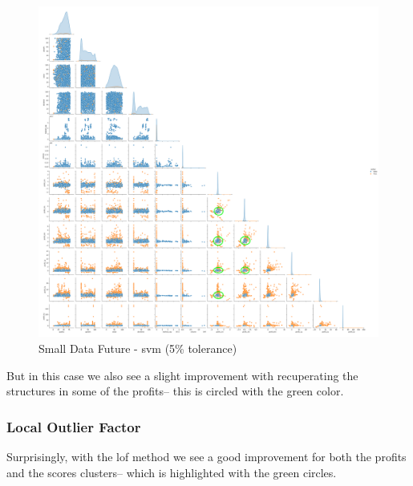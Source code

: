 \documentclass[11pt,english,a4paper,hidelinks]{book}
\begin{document}
\begin{figure}[H]
    \centering
    \includegraphics[width=1\textwidth]{images/code/outliers/Small Data future - SVM.png}
    \caption{Small Data Future - \acrshort{svm} (5\% tolerance)}
    \label{fig:small_data_future_svm}
\end{figure}

\noindent But in this case we also see a slight improvement with recuperating the structures in some of the profits--  this is circled with the green color.

\newpage
\subsubsection{Local Outlier Factor}

\noindent Surprisingly, with the \acrshort{lof} method we see a good improvement for both the profits and the scores clusters-- which is highlighted with the green circles.
\end{document}
